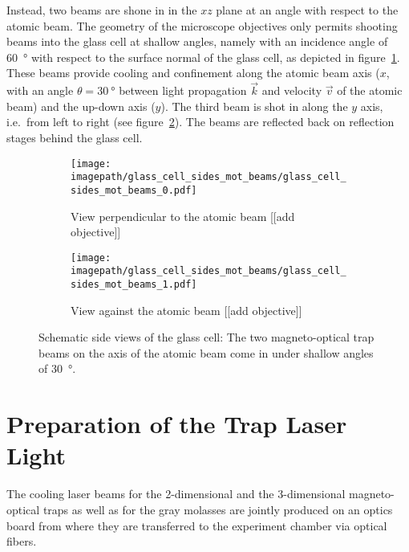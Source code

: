 Instead, two beams are shone in in the $xz$ plane at an angle with respect to the atomic beam. The geometry of the microscope objectives only permits shooting beams into the glass cell at shallow angles, namely with an incidence angle of \SI{60}{\degree} with respect to the surface normal of the glass cell, as depicted in figure~\ref{fig:glass_cell_sides_mot_beams_0}. These beams provide cooling and confinement along the atomic beam axis ($x$, with an angle $\theta = \SI{30}{\degree}$ between light propagation $\vec k$ and velocity $\vec v$ of the atomic beam) and the up-down axis ($y$). The third beam is shot in along the $y$ axis, i.e.\ from left to right (see figure~\ref{fig:glass_cell_sides_mot_beams_1}). The beams are reflected back on reflection stages behind the glass cell.

\begin{figure}
    \centering
    \begin{subfigure}{0.49\textwidth}
        \centering
        \texttt{[image: \\imagepath/glass\_cell\_sides\_mot\_beams/glass\_cell\_sides\_mot\_beams\_0.pdf]}
        \caption{View perpendicular to the atomic beam [[add objective]]}\label{fig:glass_cell_sides_mot_beams_0}
    \end{subfigure}
    \begin{subfigure}{0.49\textwidth}
        \centering
        \texttt{[image: \\imagepath/glass\_cell\_sides\_mot\_beams/glass\_cell\_sides\_mot\_beams\_1.pdf]}
        \caption{View against the atomic beam [[add objective]]}\label{fig:glass_cell_sides_mot_beams_1}
    \end{subfigure}
    \caption{Schematic side views of the glass cell: The two magneto-optical trap beams on the axis of the atomic beam come in under shallow angles of \SI{30}{\degree}.
    }\label{fig:glass_cell_sides_mot_beams}
\end{figure} 

\section{Preparation of the Trap Laser Light}
The cooling laser beams for the 2-dimensional and the 3-dimensional magneto-optical traps as well as for the gray molasses are jointly produced on an optics board from where they are transferred to the experiment chamber via optical fibers.

